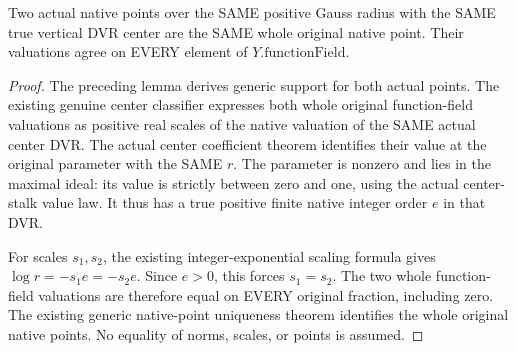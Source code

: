\begin{lemma}
\label{lem:gauss-common-vertical-dvr-gauss-uniqueness}
\leanok
Two actual native points over the SAME positive Gauss radius with the
SAME true vertical DVR center are the SAME whole original native point.
Their valuations agree on EVERY element of $Y.\mathrm{functionField}$.
\end{lemma}
\begin{proof}
The preceding lemma derives generic support for both actual points.
The existing genuine center classifier expresses both whole original
function-field valuations as positive real scales of the native valuation
of the SAME actual center DVR. The actual center coefficient theorem
identifies their value at the original parameter with the SAME $r$.
The parameter is nonzero and lies in the maximal ideal: its value is
strictly between zero and one, using the actual center-stalk value law.
It thus has a true positive finite native integer order $e$ in that DVR.

For scales $s_1,s_2$, the existing integer-exponential scaling formula
gives $\log r=-s_1e=-s_2e$. Since $e>0$, this forces $s_1=s_2$.
The two whole function-field valuations are therefore equal on EVERY
original fraction, including zero. The existing generic native-point
uniqueness theorem identifies the whole original native points.
No equality of norms, scales, or points is assumed.
\end{proof}

